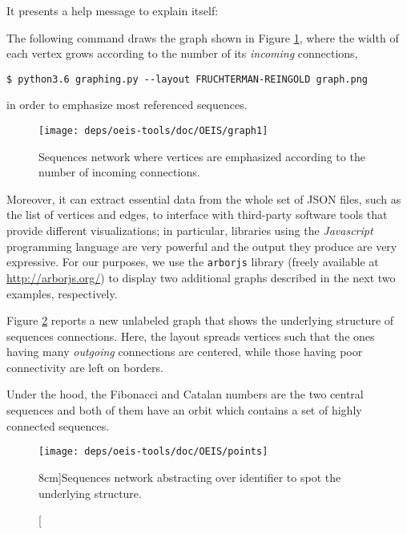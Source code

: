 It presents a help message to explain itself:

\begin{example}
The following command draws the graph shown in Figure
\ref{fig:oeis:sequences:network}, where the width of each vertex grows
according to the number of its \textit{incoming} connections,
\begin{Verbatim}[fontsize=\small]
$ python3.6 graphing.py --layout FRUCHTERMAN-REINGOLD graph.png
\end{Verbatim}
in order to emphasize most referenced sequences.
\end{example}

\begin{figure}
\texttt{[image: deps/oeis-tools/doc/OEIS/graph1]}
\caption{Sequences network where vertices are emphasized according to the
number of incoming connections.}
\label{fig:oeis:sequences:network}
\end{figure}

Moreover, it can extract essential data from the whole set of JSON files, such
as the list of vertices and edges, to interface with third-party software tools
that provide different visualizations; in particular, libraries using the
\textit{Javascript} programming language are very powerful and the output they
produce are very expressive. For our purposes, we use the \verb|arborjs|
library (freely available at \url{http://arborjs.org/}) to display two
additional graphs described in the next two examples, respectively.

\begin{example}
Figure \ref{fig:oeis:sequences:network:fibonacci:catalan} reports a new
unlabeled graph that shows the underlying structure of sequences connections.
Here, the layout spreads vertices such that the ones having many
\textit{outgoing} connections are centered, while those having poor
connectivity are left on borders.

Under the hood, the Fibonacci and Catalan numbers are the two central sequences
and both of them have an orbit which contains a set of highly connected
sequences.
\end{example}

\begin{figure}
\texttt{[image: deps/oeis-tools/doc/OEIS/points]}
\caption[][8cm]{Sequences network abstracting over identifier to spot the underlying
structure.}
\label{fig:oeis:sequences:network:fibonacci:catalan}
\end{figure}

